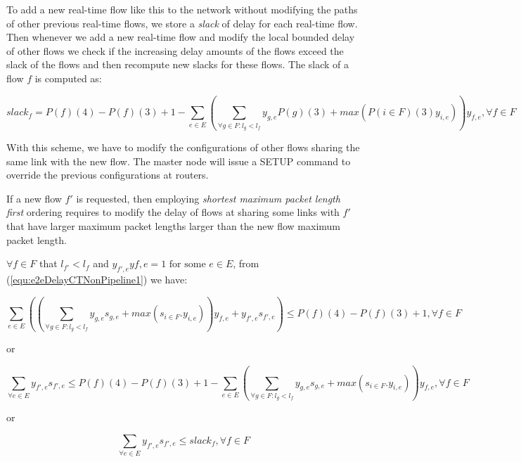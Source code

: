 \documentclass[a4]{article}
\begin{document}
To add a new real-time flow like this to the network without modifying the paths
of other previous real-time flows, we store a {\em slack} of delay for each
real-time flow. Then whenever we add a new real-time flow and modify the local
bounded delay of other flows we check if the increasing delay amounts of the
flows exceed the slack of the flows and then recompute new slacks for these
flows. The slack of a flow $f$ is computed as:

\begin{equation}\label{equ:slack1}
	slack_f=P(f)(4)-P(f)(3) +
1 - \sum_{e \in E} (\sum_{\forall g \in F:l_g <
l_{f}}y_{g,e}P(g)(3)+max(P(i \in F)(3)y_{i,e}))y_{f,e}, \forall f \in F
\end{equation}

With this scheme, we have to modify the configurations of other flows sharing
the same link with the new flow. The master node will issue a SETUP command to
override the previous configurations at routers.

If a new flow $f'$ is requested, then employing {\em shortest maximum packet
length first} ordering requires to modify the delay of flows at sharing some
links with $f'$ that have larger maximum packet lengths larger than the new flow
maximum packet length. 

$\forall f \in F$  that $l_{f'} < l_f$ and $y_{f',e}y{f,e}=1 \mbox{ for some } e
\in E$, from (\ref{equ:e2eDelayCTNonPipeline1}) we have:

\begin{equation}\label{equ:e2eDelayModification}
\sum_{e \in E} \left(\left(\sum_{\forall g \in F:l_g <
l_{f}}y_{g,e}s_{g,e}+max(s_{i \in F}.y_{i,e})\right)y_{f,e}
+y_{f',e}s_{f',e}\right) \leq P(f)(4)-P(f)(3) + 1, \forall f \in F
\end{equation}

or

\begin{equation}\label{equ:e2eDelayModificatio2}
\sum_{\forall e \in E}y_{f',e}s_{f',e} \leq P(f)(4)-P(f)(3) + 1 - \sum_{e \in E}
\left(\sum_{\forall g \in F:l_g < l_f}y_{g,e}s_{g,e}+max(s_{i \in
F}.y_{i,e})\right)y_{f,e}, \forall f \in F
\end{equation}

or

\begin{equation}\label{equ:e2eDelayModificatio3}
\sum_{\forall e \in E}y_{f',e}s_{f',e} \leq slack_f, \forall f \in F
\end{equation}
\end{document}
